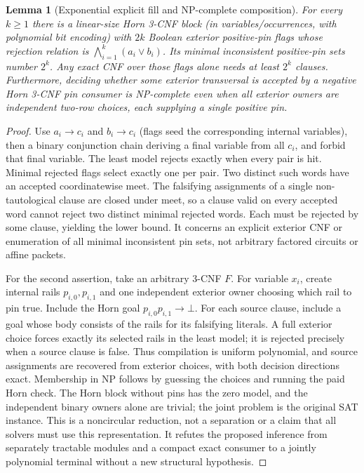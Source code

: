 \documentclass[11pt]{article}
\newtheorem{lemma}[theorem]{Lemma}
\begin{document}
\begin{lemma}[Exponential explicit fill and NP-complete composition]\label{lem:dr19-fill}
For every $k\ge1$ there is a linear-size Horn 3-CNF block (in variables/occurrences, with polynomial bit encoding) with $2k$ Boolean exterior positive-pin flags whose rejection relation is $\bigwedge_{i=1}^k(a_i\lor b_i)$. Its minimal inconsistent positive-pin sets number $2^k$. Any exact CNF over those flags alone needs at least $2^k$ clauses. Furthermore, deciding whether some exterior transversal is accepted by a negative Horn 3-CNF pin consumer is NP-complete even when all exterior owners are independent two-row choices, each supplying a single positive pin.
\end{lemma}
\begin{proof}
Use $a_i\to c_i$ and $b_i\to c_i$ (flags seed the corresponding internal variables), then a binary conjunction chain deriving a final variable from all $c_i$, and forbid that final variable. The least model rejects exactly when every pair is hit. Minimal rejected flags select exactly one per pair. Two distinct such words have an accepted coordinatewise meet. The falsifying assignments of a single non-tautological clause are closed under meet, so a clause valid on every accepted word cannot reject two distinct minimal rejected words. Each must be rejected by some clause, yielding the lower bound. It concerns an explicit exterior CNF or enumeration of all minimal inconsistent pin sets, not arbitrary factored circuits or affine packets.

For the second assertion, take an arbitrary 3-CNF $F$. For variable $x_i$, create internal rails $p_{i,0},p_{i,1}$ and one independent exterior owner choosing which rail to pin true. Include the Horn goal $p_{i,0}p_{i,1}\to\bot$. For each source clause, include a goal whose body consists of the rails for its falsifying literals. A full exterior choice forces exactly its selected rails in the least model; it is rejected precisely when a source clause is false. Thus compilation is uniform polynomial, and source assignments are recovered from exterior choices, with both decision directions exact. Membership in NP follows by guessing the choices and running the paid Horn check. The Horn block without pins has the zero model, and the independent binary owners alone are trivial; the joint problem is the original SAT instance. This is a noncircular reduction, not a separation or a claim that all solvers must use this representation. It refutes the proposed inference from separately tractable modules and a compact exact consumer to a jointly polynomial terminal without a new structural hypothesis.
\end{proof}
\end{document}
